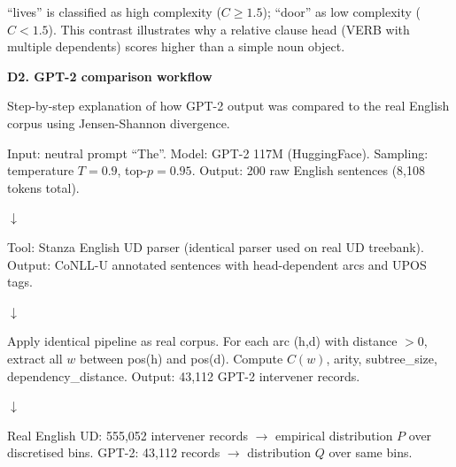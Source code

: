 \documentclass[11pt,a4paper]{article}
\begin{document}
``lives'' is classified as high complexity ($C \geq 1.5$); ``door'' as low complexity ($C < 1.5$). This contrast illustrates why a relative clause head (VERB with multiple dependents) scores higher than a simple noun object.

\vspace{4pt}
\noindent\textbf{D2. GPT-2 comparison workflow}

Step-by-step explanation of how GPT-2 output was compared to the real English corpus using Jensen-Shannon divergence.

\begin{tcolorbox}[enhanced, title=STEP 1 --- GPT-2 Text Generation,
  colback=gray!5, colframe=gray!50, coltitle=black,
  fonttitle=\small\bfseries, boxrule=0.5pt, left=4pt, right=4pt, top=3pt, bottom=3pt]
\small Input: neutral prompt ``The''. Model: GPT-2 117M (HuggingFace). Sampling: temperature $T=0.9$, top-$p=0.95$. Output: 200 raw English sentences (8,108 tokens total).
\end{tcolorbox}
\begin{center}\small$\downarrow$\end{center}
\begin{tcolorbox}[enhanced, title=STEP 2 --- UD Dependency Parsing,
  colback=gray!5, colframe=gray!50, coltitle=black,
  fonttitle=\small\bfseries, boxrule=0.5pt, left=4pt, right=4pt, top=3pt, bottom=3pt]
\small Tool: Stanza English UD parser (identical parser used on real UD treebank). Output: CoNLL-U annotated sentences with head-dependent arcs and UPOS tags.
\end{tcolorbox}
\begin{center}\small$\downarrow$\end{center}
\begin{tcolorbox}[enhanced, title=STEP 3 --- Intervener Feature Extraction,
  colback=gray!5, colframe=gray!50, coltitle=black,
  fonttitle=\small\bfseries, boxrule=0.5pt, left=4pt, right=4pt, top=3pt, bottom=3pt]
\small Apply identical pipeline as real corpus. For each arc (h,d) with distance $> 0$, extract all $w$ between pos(h) and pos(d). Compute $C(w)$, arity, subtree\_size, dependency\_distance. Output: 43,112 GPT-2 intervener records.
\end{tcolorbox}
\begin{center}\small$\downarrow$\end{center}
\begin{tcolorbox}[enhanced, title=STEP 4 --- Build Probability Distributions,
  colback=gray!5, colframe=gray!50, coltitle=black,
  fonttitle=\small\bfseries, boxrule=0.5pt, left=4pt, right=4pt, top=3pt, bottom=3pt]
\small Real English UD: 555,052 intervener records $\rightarrow$ empirical distribution $P$ over discretised bins. GPT-2: 43,112 records $\rightarrow$ distribution $Q$ over same bins.
\end{tcolorbox}
\end{document}
